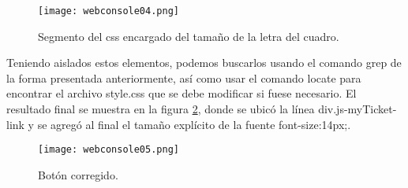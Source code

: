 \begin{figure}[H]
\centering
\texttt{[image: webconsole04.png]}
\caption{Segmento del css encargado del tamaño de la letra del  cuadro.}
\label{fig:js:24}
\end{figure}
Teniendo aislados estos elementos, podemos buscarlos usando el comando grep de la forma presentada anteriormente, así como usar el comando locate para encontrar el archivo style.css que se debe modificar si fuese necesario. El resultado final se muestra en la figura \ref{fig:js:25}, donde se ubicó la línea div.js-myTicket-link y se  agregó al final el tamaño explícito de la fuente font-size:14px;.
\begin{figure}[H]
\centering
\texttt{[image: webconsole05.png]}
\caption{Botón corregido.}
\label{fig:js:25}
\end{figure}

